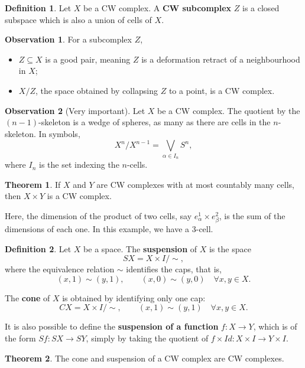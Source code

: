 \documentclass{book}
\theoremstyle{definition}
\newtheorem*{defn}{Definition}
\newtheorem*{obs}{Observation}
\newtheorem*{teo}{Theorem}
\begin{document}
\begin{defn}
Let $X$ be a CW complex. A \textbf{CW subcomplex} $Z$ is a
closed subspace which is also a union of cells of $X$.
\end{defn}

\begin{obs}
For a subcomplex $Z$,
\begin{itemize}
\item $Z\subseteq X$ is a good pair, meaning $Z$ is a
deformation retract of a neighbourhood in $X$;
\item $X/Z$, the space obtained by collapsing $Z$ to a point,
is a CW complex.
\end{itemize}
\end{obs}

\begin{obs}[Very important]
Let $X$ be a CW complex. The quotient by the $(n-1)$-skeleton
is a wedge of spheres, as many as there are cells in the
$n$-skeleton. In symbols,
$$
X^n/X^{n-1}=\bigvee_{\alpha\in I_n}S^n,
$$
where $I_n$ is the set indexing the $n$-cells.
\end{obs}

\begin{teo}
If $X$ and $Y$ are CW complexes with at most countably many
cells, then $X\times Y$ is a CW complex.
\end{teo}

Here, the dimension of the product of two cells, say
$e^1_\alpha\times e^2_\beta$, is the sum of the dimensions of
each one. In this example, we have a 3-cell.

\begin{defn}
Let $X$ be a space. The \textbf{suspension} of $X$ is the
space
$$
SX=X\times I/\sim,
$$
where the equivalence relation $\sim$ identifies the caps,
that is,
$$
(x,1)\sim(y,1),
\qquad
(x,0)\sim(y,0)
\quad\forall x,y\in X.
$$

The \textbf{cone} of $X$ is obtained by identifying only one
cap:
$$
CX=X\times I/\sim,
\qquad
(x,1)\sim(y,1)
\quad\forall x,y\in X.
$$

It is also possible to define the \textbf{suspension of a
function} $f:X\to Y$, which is of the form
$Sf:SX\to SY$, simply by taking the quotient of
$f\times Id:X\times I\to Y\times I$.
\end{defn}

\begin{teo}
The cone and suspension of a CW complex are CW complexes.
\end{teo}
\end{document}
